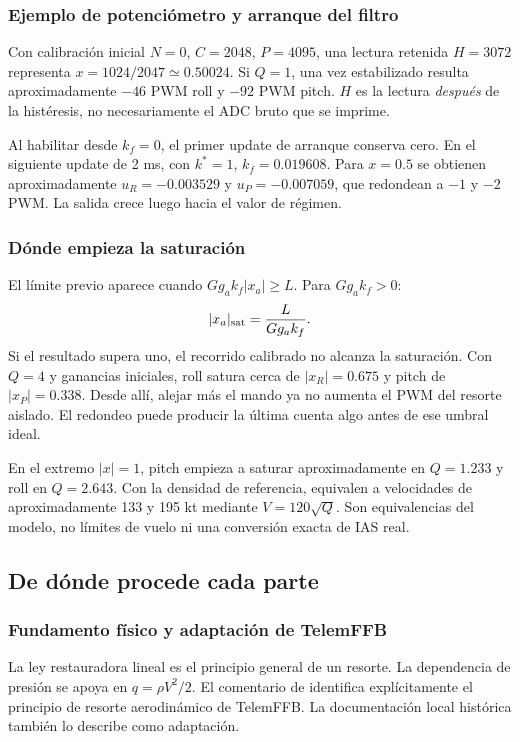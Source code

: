 \documentclass[11pt,a4paper]{article}
\newcommand{\code}[1]{\texttt{\detokenize{#1}}}
\begin{document}
\subsubsection{Ejemplo de potenciómetro y arranque del filtro}
Con calibración inicial $N=0$, $C=2048$, $P=4095$, una lectura retenida $H=3072$ representa $x=1024/2047\simeq0.50024$. Si $Q=1$, una vez estabilizado resulta aproximadamente $-46$ PWM roll y $-92$ PWM pitch. $H$ es la lectura \emph{después} de la histéresis, no necesariamente el ADC bruto que se imprime.

Al habilitar desde $k_f=0$, el primer update de arranque conserva cero. En el siguiente update de 2 ms, con $k^*=1$, $k_f=0.019608$. Para $x=0.5$ se obtienen aproximadamente $u_R=-0.003529$ y $u_P=-0.007059$, que redondean a $-1$ y $-2$ PWM. La salida crece luego hacia el valor de régimen.

\subsubsection{Dónde empieza la saturación}
El límite previo aparece cuando $Gg_ak_f|x_a|\ge L$. Para $Gg_ak_f>0$:
\begin{equation}
|x_a|_{\rm sat}=\frac{L}{Gg_ak_f}.
\end{equation}
Si el resultado supera uno, el recorrido calibrado no alcanza la saturación. Con $Q=4$ y ganancias iniciales, roll satura cerca de $|x_R|=0.675$ y pitch de $|x_P|=0.338$. Desde allí, alejar más el mando ya no aumenta el PWM del resorte aislado. El redondeo puede producir la última cuenta algo antes de ese umbral ideal.

En el extremo $|x|=1$, pitch empieza a saturar aproximadamente en $Q=1.233$ y roll en $Q=2.643$. Con la densidad de referencia, equivalen a velocidades de aproximadamente 133 y 195 kt mediante $V=120\sqrt Q$. Son equivalencias del modelo, no límites de vuelo ni una conversión exacta de IAS real.

\subsection{De dónde procede cada parte}
\subsubsection{Fundamento físico y adaptación de TelemFFB}
La ley restauradora lineal es el principio general de un resorte. La dependencia de presión se apoya en $q=\rho V^2/2$. El comentario de \code{SimEffects.h} identifica explícitamente el principio de resorte aerodinámico de TelemFFB. La documentación local histórica también lo describe como adaptación.
\end{document}
